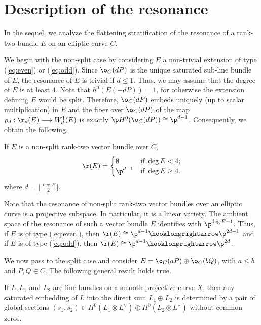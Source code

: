 \documentclass[10pt, leqno]{amsart}
\begin{document}
\section{Description of the resonance}

In the sequel, we analyze the flattening stratification of the resonance of a rank-two bundle $E$ on an elliptic curve $C$.

We begin with the non-split case by considering $E$ a non-trivial extension of type (\ref{eq:even}) or (\ref{eq:odd}).
Since $\o_C(dP)$ is the unique saturated sub-line bundle of $E$, the resonance of $E$ is trivial if $d \le 1$.
Thus, we may assume that the degree of $E$ is at least $4$.
Note that $h^0(E(-dP)) = 1$, for otherwise the extension defining $E$ would be split.
Therefore, $\o_C(dP)$ embeds uniquely (up to scalar multiplication) in $E$ and the fiber over $\o_C(dP)$ of the map $\rho_d : \r_d(E) \longrightarrow W^1_d(E)$ is exactly $\p H^0(\o_C(dP)) \cong \p^{d-1}$.
Consequently, we obtain the following.

\begin{prop} \label{prop:non_split}
If $E$ is a non-split rank-two vector bundle over $C$,
\[
\r(E) = \begin{cases}
      \emptyset & \text{if}\ \deg E < 4; \\
      \p^{d-1}  & \text{if}\ \deg E \ge 4.
    \end{cases}  
\]
where $d = \lfloor \frac{\deg E}{2} \rfloor$.
\end{prop}

\begin{rem} \label{rem:ambient}
Note that the resonance of non-split rank-two vector bundles over an elliptic curve is a projective subspace. In particular, it is a linear variety. The ambient space of the resonance of such a vector bundle $E$ identifies with $\p^{\deg E - 1}$. Thus, if $E$ is of type (\ref{eq:even}), then $\r(E) \cong \p^{d - 1} \hooklongrightarrow \p^{2d - 1}$ and if $E$ is of type (\ref{eq:odd}), then $\r(E) \cong \p^{d - 1} \hooklongrightarrow \p^{2d}$.
\end{rem}

We now pass to the split case and consider $E = \o_C(aP) \oplus \o_C(bQ)$, with $a \le b$ and $P,Q \in C$. The following general result holds true.

\begin{lem} \label{lem:saturated_embedding}
If $L, L_1$ and $L_2$ are line bundles on a smooth projective curve $X$, then any saturated embedding of $L$ into the direct sum $L_1 \oplus L_2$ is determined by a pair of global sections $(s_1, s_2) \in H^0(L_1 \otimes L^\vee) \oplus H^0(L_2 \otimes L^\vee)$ without common zeros.
\end{lem}
\end{document}
